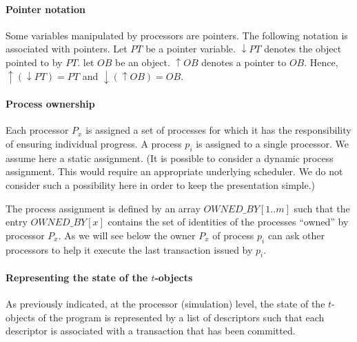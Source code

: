 \paragraph{Pointer notation} 
Some  variables  manipulated  by  processors are  pointers.  The  following
notation is associated with pointers. Let  $PT$   be a pointer variable.  
$\downarrow PT$ denotes the object pointed to by $PT$. let 
$OB$ be an object. $\uparrow OB$ denotes a  pointer to $OB$. 
Hence, $\uparrow (\downarrow PT) =PT$ and  $ \downarrow (\uparrow OB) = OB$.  





\paragraph{Process ownership}
Each processor $P_x$  is assigned a set of processes for which it has the
responsibility of ensuring individual progress. A process $p_i$ is 
assigned to a single processor.  We assume here a static  assignment. 
(It is possible to consider a dynamic process assignment. This would 
require an appropriate underlying scheduler. We do not consider  
such a possibility  here in order to keep the presentation simple.)

The process assignment is defined by   an array 
$\mathit{OWNED\_BY}[1..m]$  such that the entry $\mathit{OWNED\_BY}[x]$ 
contains the set of identities of the processes ``owned'' by  processor $P_x$. 
As we will  see below the owner $P_x$ of process $p_i$ can ask other 
processors to help it execute the last transaction issued by $p_i$. 

\paragraph{Representing the state of the $t$-objects}
As previously indicated, at the processor (simulation) level, the state of the
 $t$-objects of the program is represented  by a list  of descriptors such 
that each descriptor is associated with a transaction that has been committed.

